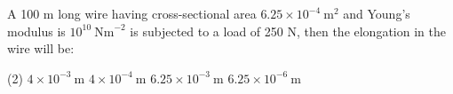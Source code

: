 \item A 100 m long wire having cross-sectional area $6.25 \times 10^{-4} \ \text{m}^2$ and Young's modulus is $10^{10} \ \text{Nm}^{-2}$ is subjected to a load of 250 N, then the elongation in the wire will be:
    \begin{tasks}(2)
        \task $4 \times 10^{-3} \ \text{m}$
        \task $4 \times 10^{-4} \ \text{m}$
        \task $6.25 \times 10^{-3} \ \text{m}$
        \task $6.25 \times 10^{-6} \ \text{m}$
    \end{tasks}